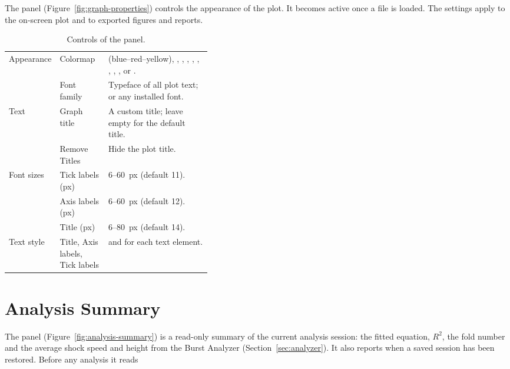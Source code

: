 The  panel (Figure~\ref{fig:graph-properties}) controls the
appearance of the plot. It becomes active once a file is loaded. The settings apply to
the on-screen plot and to exported figures and reports.


\begin{table}[!htbp]
  \centering
  \caption{Controls of the  panel.}
  \label{tab:graph-properties}
  \small
  \begin{tabularx}{\linewidth}{@{}P{0.16\linewidth}P{0.24\linewidth}L@{}}
    \toprule
     &  &  \\
    \midrule
    Appearance & Colormap &  (blue--red--yellow), , , , , , , , ,  or . \\
               & Font family & Typeface of all plot text;  or any installed font. \\
    Text & Graph title & A custom title; leave empty for the default title. \\
         & Remove Titles & Hide the plot title. \\
    Font sizes & Tick labels (px) & 6--60~px (default 11). \\
               & Axis labels (px) & 6--60~px (default 12). \\
               & Title (px) & 6--80~px (default 14). \\
    Text style & Title, Axis labels, Tick labels &  and  for each text element. \\
    \bottomrule
  \end{tabularx}
\end{table}

\section{Analysis Summary}
\label{sec:analysis-summary}

The  panel (Figure~\ref{fig:analysis-summary}) is a read-only summary
of the current analysis session: the fitted equation, \(R^2\), the fold number and the
average shock speed and height from the Burst Analyzer (Section~\ref{sec:analyzer}). It
also reports when a saved session has been restored. Before any analysis it reads

